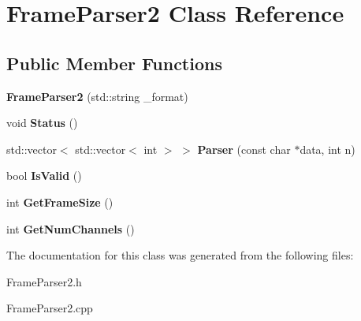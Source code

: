 \hypertarget{classFrameParser2}{
\section{FrameParser2 Class Reference}
\label{classFrameParser2}
}
\subsection*{Public Member Functions}
\begin{DoxyCompactItemize}
\item 
\hypertarget{classFrameParser2_a7d649b12ffe5882157895193c7534ddc}{
{\bfseries FrameParser2} (std::string \_\-format)}
\label{classFrameParser2_a7d649b12ffe5882157895193c7534ddc}

\item 
\hypertarget{classFrameParser2_a596b1821e08bb545c63cdc7d797fa0e5}{
void {\bfseries Status} ()}
\label{classFrameParser2_a596b1821e08bb545c63cdc7d797fa0e5}

\item 
\hypertarget{classFrameParser2_a243ae3e07b40505f6f82e75652cf5e61}{
std::vector$<$ std::vector$<$ int $>$ $>$ {\bfseries Parser} (const char $\ast$data, int n)}
\label{classFrameParser2_a243ae3e07b40505f6f82e75652cf5e61}

\item 
\hypertarget{classFrameParser2_a39ee133734cffde376e086503fcc5af6}{
bool {\bfseries IsValid} ()}
\label{classFrameParser2_a39ee133734cffde376e086503fcc5af6}

\item 
\hypertarget{classFrameParser2_aeb5e9927c20ddaf6535fb8fcca367e86}{
int {\bfseries GetFrameSize} ()}
\label{classFrameParser2_aeb5e9927c20ddaf6535fb8fcca367e86}

\item 
\hypertarget{classFrameParser2_aab4b9556f299ab3a4c3f73bb5ca38538}{
int {\bfseries GetNumChannels} ()}
\label{classFrameParser2_aab4b9556f299ab3a4c3f73bb5ca38538}

\end{DoxyCompactItemize}


The documentation for this class was generated from the following files:\begin{DoxyCompactItemize}
\item 
FrameParser2.h\item 
FrameParser2.cpp\end{DoxyCompactItemize}
